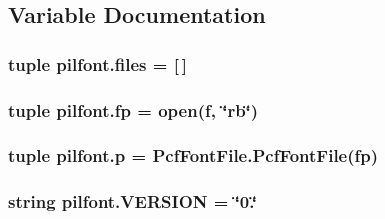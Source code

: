 \subsection{Variable Documentation}
\hypertarget{namespacepilfont_ae3f6feb13e5bfae313c861c3babfa849}{
\subsubsection[{files}]{\setlength{\rightskip}{0pt plus 5cm}tuple pilfont.\-files = \mbox{[}$\,$\mbox{]}}}\label{namespacepilfont_ae3f6feb13e5bfae313c861c3babfa849}
\hypertarget{namespacepilfont_a638abcd1a8707a6ba6223cbb9fc8ac3d}{
\subsubsection[{fp}]{\setlength{\rightskip}{0pt plus 5cm}tuple pilfont.\-fp = open({\bf f}, \char`\"{}rb\char`\"{})}}\label{namespacepilfont_a638abcd1a8707a6ba6223cbb9fc8ac3d}
\hypertarget{namespacepilfont_ab4c87fc92a3c3c333c9f41fced31fe09}{
\subsubsection[{p}]{\setlength{\rightskip}{0pt plus 5cm}tuple pilfont.\-p = Pcf\-Font\-File.\-Pcf\-Font\-File({\bf fp})}}\label{namespacepilfont_ab4c87fc92a3c3c333c9f41fced31fe09}
\hypertarget{namespacepilfont_a9650494ad2d5214e4386c4924a047d37}{
\subsubsection[{V\-E\-R\-S\-I\-O\-N}]{\setlength{\rightskip}{0pt plus 5cm}string pilfont.\-V\-E\-R\-S\-I\-O\-N = \char`\"{}0.\char`\"{}}}\label{namespacepilfont_a9650494ad2d5214e4386c4924a047d37}
